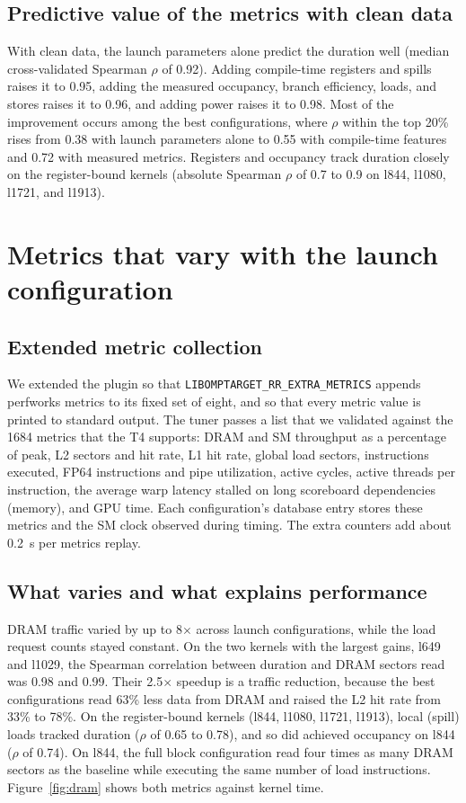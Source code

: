 \documentclass[10pt]{article}
\newcommand{\x}{\ensuremath{\times}}
\newcommand{\code}[1]{\texttt{#1}}
\begin{document}
\subsection{Predictive value of the metrics with clean data}
With clean data, the launch parameters alone predict the duration well
(median cross-validated Spearman $\rho$ of 0.92). Adding compile-time
registers and spills raises it to 0.95, adding the measured occupancy, branch
efficiency, loads, and stores raises it to 0.96, and adding power raises it to
0.98. Most of the improvement occurs among the best configurations, where
$\rho$ within the top 20\% rises from 0.38 with launch parameters alone to
0.55 with compile-time features and 0.72 with measured metrics. Registers and
occupancy track duration closely on the register-bound kernels (absolute
Spearman $\rho$ of 0.7 to 0.9 on l844, l1080, l1721, and l1913).

\section{Metrics that vary with the launch configuration}
\label{sec:metrics}

\subsection{Extended metric collection}
We extended the plugin so that \code{LIBOMPTARGET\_RR\_EXTRA\_METRICS} appends
perfworks metrics to its fixed set of eight, and so that every metric value is
printed to standard output. The tuner passes a list that we validated against
the 1684 metrics that the T4 supports: DRAM and SM throughput as a percentage
of peak, L2 sectors and hit rate, L1 hit rate, global load sectors,
instructions executed, FP64 instructions and pipe utilization, active cycles,
active threads per instruction, the average warp latency stalled on long
scoreboard dependencies (memory), and GPU time. Each configuration's database
entry stores these metrics and the SM clock observed during timing. The extra
counters add about 0.2~s per metrics replay.

\subsection{What varies and what explains performance}
DRAM traffic varied by up to 8\x{} across launch configurations, while the
load request counts stayed constant. On the two kernels with the largest
gains, l649 and l1029, the Spearman correlation between duration and DRAM
sectors read was 0.98 and 0.99. Their 2.5\x{} speedup is a traffic reduction,
because the best configurations read 63\% less data from DRAM and raised the
L2 hit rate from 33\% to 78\%. On the register-bound kernels (l844, l1080,
l1721, l1913), local (spill) loads tracked duration ($\rho$ of 0.65 to 0.78),
and so did achieved occupancy on l844 ($\rho$ of 0.74). On l844, the full
block configuration read four times as many DRAM sectors as the baseline
while executing the same number of load instructions.
Figure~\ref{fig:dram} shows both metrics against kernel time.
\end{document}
